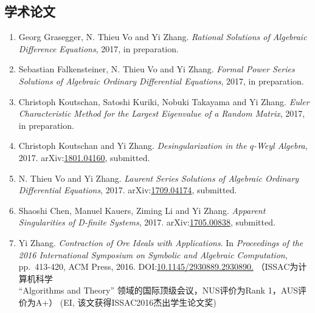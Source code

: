 \documentclass[a4paper,12pt]{article}
\newcommand{\red}{\color{red}}
\begin{document}
\begin{CJK*}{UTF8}{gbsn}
\section*{\Large{学术论文}}
\begin{enumerate}
\item Georg Grasegger, N. Thieu Vo and Yi Zhang. 
{\em Rational Solutions of Algebraic Difference Equations}, 2017, in preparation.
\item Sebastian Falkensteiner, N. Thieu Vo and Yi Zhang. 
 {\em Formal Power Series Solutions of Algebraic Ordinary Differential Equations}, 2017, in preparation.
\item Christoph Koutschan, Satoshi Kuriki, Nobuki Takayama and Yi Zhang. 
 {\em Euler Characteristic Method for the Largest Eigenvalue of a Random Matrix}, 2017, in preparation. 
\item Christoph Koutschan and Yi Zhang. {\em Desingularization in the $q$-Weyl Algebra}, 2017. 
arXiv:\href{https://arxiv.org/abs/1801.04160}{1801.04160}, submitted.
\item N. Thieu Vo and Yi Zhang. {\em Laurent Series Solutions of Algebraic Ordinary Differential Equations}, 2017. 
 arXiv:\href{https://arxiv.org/abs/1709.04174}{1709.04174}, submitted. 
\item Shaoshi Chen, Manuel Kauers, Ziming Li and Yi Zhang. {\em Apparent Singularities of D-finite Systems}, 2017. 
 arXiv:\href{http://arxiv.org/abs/1705.00838}{1705.00838}, submitted.
\item Yi Zhang. {\em Contraction of Ore Ideals with Applications}. 
In {\em Proceedings of the 2016 International Symposium on Symbolic and Algebraic Computation}, 
pp.\ 413-420, ACM Press, 2016. DOI:\href{http://dl.acm.org/citation.cfm?id=2930890}{10.1145/2930889.2930890.} 
{\red （ISSAC为计算机科学 \\
“Algorithms and Theory”
领域的国际顶级会议，NUS评价为Rank 1，AUS评价为A+） (EI, 该文获得ISSAC2016杰出学生论文奖)} 
\end{enumerate}



\end{CJK*}
\end{document}

